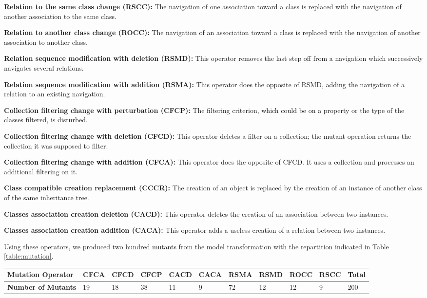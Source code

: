\textbf{Relation to the same class change (RSCC): }The navigation of one association toward a class is replaced with the navigation of another association to the same class.

\textbf{Relation to another class change (ROCC): }The navigation of an association toward a class is replaced with the navigation of another association to another class.

\textbf{Relation sequence modification with deletion (RSMD): }This operator removes the last step off from a navigation which successively navigates several relations.

\textbf{Relation sequence modification with addition (RSMA): }This operator does the opposite of RSMD, adding the navigation of a relation to an existing navigation.

\textbf{Collection filtering change with perturbation (CFCP): }The filtering criterion, which could be on a property or the type of the classes filtered, is disturbed.

\textbf{Collection filtering change with deletion (CFCD): }This operator deletes a filter on a collection; the mutant operation returns the collection it was supposed to filter.

\textbf{Collection filtering change with addition (CFCA): }This operator does the opposite of CFCD. It uses a collection and processes an additional filtering on it.

\textbf{Class compatible creation replacement (CCCR): }The creation of an object is replaced by the creation of an instance of another class of the same inheritance tree.

\textbf{Classes association creation deletion (CACD): }This operator deletes the creation of an association between two instances.

\textbf{Classes association creation addition (CACA): }This operator adds a useless creation of a relation between two instances.

Using these operators, we produced two hundred mutants from the {\transfo} model transformation with the repartition indicated in Table \ref{table:mutation}.
\begin{table*} 
\renewcommand{\arraystretch}{1}
\renewcommand{\arrayrulewidth}{1 pt}
\caption{Repartition of the {\transfo} mutants depending on the mutation
operator applied}
\label{table:mutation}
\centering
\begin{tabular}{l l  l l l l l l l l l}
\hline
\textbf{Mutation Operator} & CFCA & CFCD& CFCP
&CACD&CACA&RSMA&RSMD&ROCC&RSCC&Total \\ \hline 
\textbf{Number of Mutants}& 19&18&38&11&9&72&12&12&9&200\\ \hline
\end{tabular} 
\end{table*}

